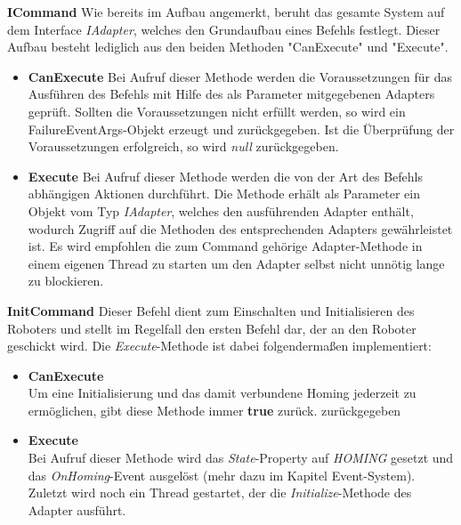 \textbf{ICommand}
\newline
Wie bereits im Aufbau angemerkt, beruht das gesamte System auf dem Interface \textit{IAdapter}, welches den Grundaufbau eines Befehls festlegt. Dieser Aufbau besteht lediglich aus den beiden Methoden "CanExecute" und "Execute".
\begin{itemize}
\item \textbf{CanExecute}
\newline
Bei Aufruf dieser Methode werden die Voraussetzungen für das Ausführen des Befehls mit Hilfe des als Parameter mitgegebenen Adapters geprüft. Sollten die Voraussetzungen nicht erfüllt werden, so wird ein FailureEventArgs-Objekt erzeugt und zurückgegeben. Ist die Überprüfung der Voraussetzungen erfolgreich, so wird \textit{null} zurückgegeben.
\item \textbf{Execute}
\newline
Bei Aufruf dieser Methode werden die von der Art des Befehls abhängigen Aktionen durchführt. Die Methode erhält als Parameter ein Objekt vom Typ \textit{IAdapter}, welches den ausführenden Adapter enthält, wodurch Zugriff auf die Methoden des entsprechenden Adapters gewährleistet ist. Es wird empfohlen die zum Command gehörige Adapter-Methode in einem eigenen Thread zu starten um den Adapter selbst nicht unnötig lange zu blockieren.
\end{itemize}

\textbf{InitCommand}
\newline
Dieser Befehl dient zum Einschalten und Initialisieren des Roboters und stellt im Regelfall den ersten Befehl dar, der an den Roboter geschickt wird. Die \textit{Execute}-Methode ist dabei folgendermaßen implementiert:
\begin{itemize}
\item \textbf{CanExecute}\\
Um eine Initialisierung und das damit verbundene Homing jederzeit zu ermöglichen, gibt diese Methode immer \textbf{true} zurück.
zurückgegeben
\item \textbf{Execute}\\
Bei Aufruf dieser Methode wird das \textit{State}-Property auf \textit{HOMING} gesetzt und das \textit{OnHoming}-Event ausgelöst (mehr dazu im Kapitel Event-System). Zuletzt wird noch ein Thread gestartet, der die \textit{Initialize}-Methode des Adapter ausführt.
\end{itemize}


